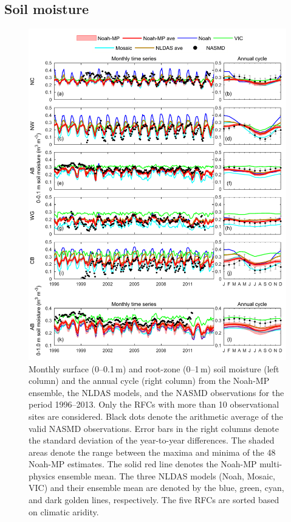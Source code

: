 \documentclass[essd, manuscript]{copernicus}
\begin{document}
\subsection{Soil moisture} \label{sec:results:sm}

\begin{figure}[t]
  \includegraphics[width=14cm]{fig/fig04.pdf}
  \caption{Monthly surface (0--0.1\,m) and root-zone (0--1\,m) soil moisture (left column) and the annual cycle (right column) from the Noah-MP ensemble, the NLDAS models, and the NASMD observations for the period 1996--2013. Only the RFCs with more than 10 observational sites are considered. Black dots denote the arithmetic average of the valid NASMD observations. Error bars in the right columns denote the standard deviation of the year-to-year differences. The shaded areas denote the range between the maxima and minima of the 48 Noah-MP estimates. The solid red line denotes the Noah-MP multi-physics ensemble mean. The three NLDAS models (Noah, Mosaic, VIC) and their ensemble mean are denoted by the blue, green, cyan, and dark golden lines, respectively. The five RFCs are sorted based on climatic aridity.}
  \label{fig:sm:ts}
\end{figure}
\end{document}
